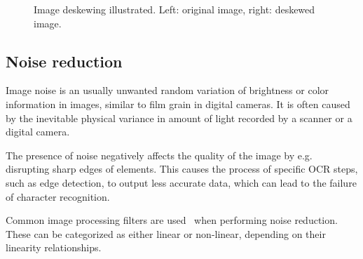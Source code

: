 \begin{figure}
\caption{Image deskewing illustrated. Left: original image, right: deskewed image.}
\label{fig:preprocessDeskewing}
\end{figure}

\subsection{Noise reduction}

Image noise is an usually unwanted random variation of brightness or color information in images, similar to film grain in digital cameras. It is often caused by the inevitable physical variance in amount of light recorded by a scanner or a digital camera.

The presence of noise negatively affects the quality of the image by e.g. disrupting sharp edges of elements. This causes the process of specific OCR steps, such as edge detection, to output less accurate data, which can lead to the failure of character recognition.

Common image processing filters are used~\citep{denoisingTechniques} when performing noise reduction. These can be categorized as either linear or non-linear, depending on their linearity relationships.

